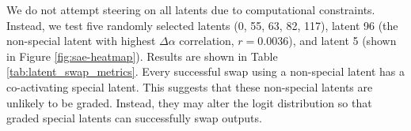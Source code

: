 We do not attempt steering on all latents due to computational constraints. Instead, we test five randomly selected latents (0, 55, 63, 82, 117), latent 96 (the non-special latent with highest $\Delta \alpha$ correlation, $r=0.0036$), and latent 5 (shown in Figure \ref{fig:sae-heatmap}). Results are shown in Table \ref{tab:latent_swap_metrics}. 
Every successful swap using a non-special latent has a co-activating special latent. This suggests that these non-special latents are unlikely to be graded. Instead, they may alter the logit distribution so that graded special latents can successfully swap outputs.
